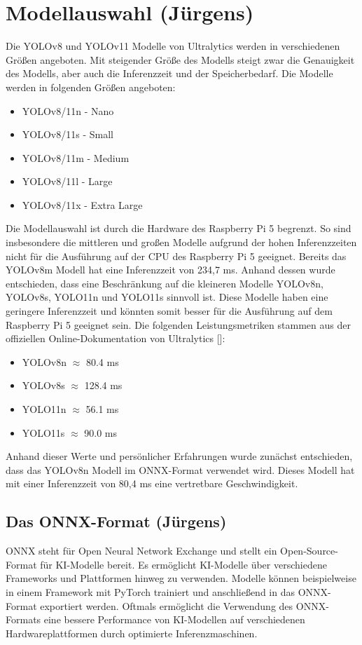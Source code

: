 \section{Modellauswahl (Jürgens)}
Die YOLOv8 und YOLOv11 Modelle von Ultralytics werden in verschiedenen Größen angeboten. Mit steigender Größe des Modells steigt zwar die Genauigkeit des Modells, aber auch die Inferenzzeit und der Speicherbedarf.
Die Modelle werden in folgenden Größen angeboten:
\begin{itemize}
  \item YOLOv8/11n - Nano 
  \item YOLOv8/11s - Small
  \item YOLOv8/11m - Medium
  \item YOLOv8/11l - Large
  \item YOLOv8/11x - Extra Large
\end{itemize}
Die Modellauswahl ist durch die Hardware des Raspberry Pi 5 begrenzt. So sind insbesondere die mittleren und großen Modelle aufgrund der hohen Inferenzzeiten nicht für die Ausführung auf der CPU des Raspberry Pi 5 geeignet. Bereits das YOLOv8m Modell hat eine Inferenzzeit von 234,7 ms. \cite{ultralyticsYOLOv8Performance} Anhand dessen wurde entschieden, dass eine Beschränkung auf die kleineren Modelle YOLOv8n, YOLOv8s, YOLO11n und YOLO11s sinnvoll ist. Diese Modelle haben eine geringere Inferenzzeit und könnten somit besser für die Ausführung auf dem Raspberry Pi 5 geeignet sein. 
Die folgenden Leistungsmetriken stammen aus der offiziellen Online-Dokumentation von Ultralytics [\cite{yolov8_ultralytics,ultralyticsYOLOv8Performance,yolo11_ultralytics}]:
\begin{itemize}
  \item YOLOv8n $\approx$ 80.4 ms
  \item YOLOv8s $\approx$ 128.4 ms
  \item YOLO11n $\approx$ 56.1 ms 
  \item YOLO11s $\approx$ 90.0 ms 
\end{itemize}

Anhand dieser Werte und persönlicher Erfahrungen wurde zunächst entschieden, dass das YOLOv8n Modell im ONNX-Format verwendet wird. Dieses Modell hat mit einer Inferenzzeit von 80,4 ms eine vertretbare Geschwindigkeit.

\subsection{Das ONNX-Format (Jürgens)}
ONNX steht für Open Neural Network Exchange und stellt ein Open-Source-Format für KI-Modelle bereit. Es ermöglicht KI-Modelle über verschiedene Frameworks und Plattformen hinweg zu verwenden. Modelle können beispielweise in einem Framework mit PyTorch trainiert und anschließend in das ONNX-Format exportiert werden. Oftmals ermöglicht die Verwendung des ONNX-Formats eine bessere Performance von KI-Modellen auf verschiedenen Hardwareplattformen durch optimierte Inferenzmaschinen. \cite{ultralyticsGlossaryONNX}

